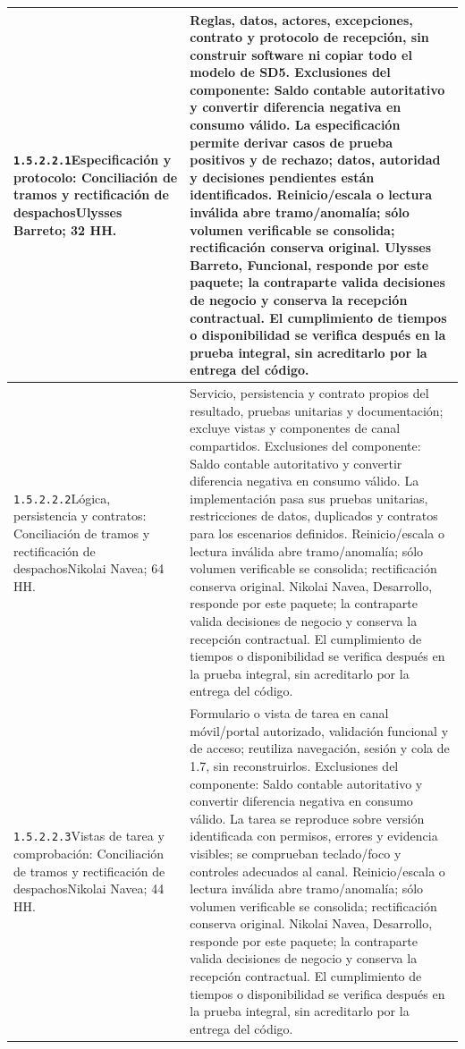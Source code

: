 \begin{longtable}{L{52mm}L{91mm}}
\texttt{1.\allowbreak{}5.\allowbreak{}2.\allowbreak{}2.\allowbreak{}1}\newline Especificación y protocolo: Conciliación de tramos y rectificación de despachos\newline Ulysses Barreto; 32 HH. & Reglas, datos, actores, excepciones, contrato y protocolo de recepción, sin construir software ni copiar todo el modelo de SD5. Exclusiones del componente: Saldo contable autoritativo y convertir diferencia negativa en consumo válido. La especificación permite derivar casos de prueba positivos y de rechazo; datos, autoridad y decisiones pendientes están identificados. Reinicio/escala o lectura inválida abre tramo/anomalía; sólo volumen verificable se consolida; rectificación conserva original. Ulysses Barreto, Funcional, responde por este paquete; la contraparte valida decisiones de negocio y conserva la recepción contractual. El cumplimiento de tiempos o disponibilidad se verifica después en la prueba integral, sin acreditarlo por la entrega del código.\\\hline
\texttt{1.\allowbreak{}5.\allowbreak{}2.\allowbreak{}2.\allowbreak{}2}\newline Lógica, persistencia y contratos: Conciliación de tramos y rectificación de despachos\newline Nikolai Navea; 64 HH. & Servicio, persistencia y contrato propios del resultado, pruebas unitarias y documentación; excluye vistas y componentes de canal compartidos. Exclusiones del componente: Saldo contable autoritativo y convertir diferencia negativa en consumo válido. La implementación pasa sus pruebas unitarias, restricciones de datos, duplicados y contratos para los escenarios definidos. Reinicio/escala o lectura inválida abre tramo/anomalía; sólo volumen verificable se consolida; rectificación conserva original. Nikolai Navea, Desarrollo, responde por este paquete; la contraparte valida decisiones de negocio y conserva la recepción contractual. El cumplimiento de tiempos o disponibilidad se verifica después en la prueba integral, sin acreditarlo por la entrega del código.\\\hline
\texttt{1.\allowbreak{}5.\allowbreak{}2.\allowbreak{}2.\allowbreak{}3}\newline Vistas de tarea y comprobación: Conciliación de tramos y rectificación de despachos\newline Nikolai Navea; 44 HH. & Formulario o vista de tarea en canal móvil/portal autorizado, validación funcional y de acceso; reutiliza navegación, sesión y cola de 1.7, sin reconstruirlos. Exclusiones del componente: Saldo contable autoritativo y convertir diferencia negativa en consumo válido. La tarea se reproduce sobre versión identificada con permisos, errores y evidencia visibles; se comprueban teclado/foco y controles adecuados al canal. Reinicio/escala o lectura inválida abre tramo/anomalía; sólo volumen verificable se consolida; rectificación conserva original. Nikolai Navea, Desarrollo, responde por este paquete; la contraparte valida decisiones de negocio y conserva la recepción contractual. El cumplimiento de tiempos o disponibilidad se verifica después en la prueba integral, sin acreditarlo por la entrega del código.\\\hline

\end{longtable}
